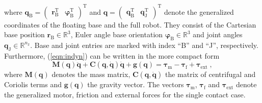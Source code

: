 %
where 
%
$\bm{q}_\mathrm{B}=\begin{pmatrix}\bm{r}_\mathrm{B} ^\mathrm{T}& \bm{\varphi}_\mathrm{B}^\mathrm{T}\end{pmatrix}^\mathrm{T}$
%
and 
%
$\bm{q}=\begin{pmatrix}\bm{q}_\mathrm{B}^\mathrm{T} & \bm{q}_\mathrm{J}^\mathrm{T}\end{pmatrix}^\mathrm{T}$
%
denote the generalized coordinates of the floating base and the full robot.
They consist of the Cartesian base position $\bm{r}_\mathrm{B} \in \mathbb{R}^3$, Euler angle base orientation $\bm{\varphi}_\mathrm{B} \in \mathbb{R}^3$ and joint angles $\bm{q}_\mathrm{J} \in \mathbb{R}^{n_\mathrm{J}}$.
Base and joint entries are marked with index ``B'' and ``J'', respectively.
%
Furthermore, (\ref{eqn:indyn}) can be written in the more compact form
%
\begin{equation}
\bm{M}(\bm{q})\ddot{\bm{q}}+\bm{C}(\bm{q},\dot{\bm{q}})\dot{\bm{q}}+\bm{g}(\bm{q})=\bm{\tau}_\mathrm{m}-\bm{\tau}_\mathrm{f}+\bm{\tau}_\mathrm{ext}\;,
\label{eqn:indyn_lumped}
\end{equation}
%
where $\bm{M}(\bm{q})$ denotes the mass matrix, $\bm{C}(\bm{q},\dot{\bm{q}})$ the matrix of centrifugal and Coriolis terms and $\bm{g}(\bm{q})$ the gravity vector.
The vectors $\bm{\tau}_\mathrm{m}$, $\bm{\tau}_\mathrm{f}$ and $\bm{\tau}_\mathrm{ext}$ denote the generalized motor, friction and external forces for the single contact case.
%

